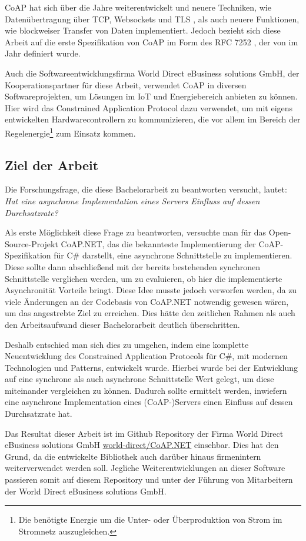 CoAP hat sich über die Jahre weiterentwickelt und neuere Techniken, wie Datenübertragung über TCP, Websockets und TLS \autocite{RFC8323}, als auch neuere Funktionen, wie blockweiser Transfer von Daten \autocite{RFC7959} implementiert. Jedoch bezieht sich diese Arbeit auf die erste Spezifikation von CoAP im Form des RFC 7252 \autocite{RFC7252}, der von \citeauthor{RFC7252} im Jahr \citeyear{RFC7252} definiert wurde.

Auch die Softwareentwicklungsfirma World Direct eBusiness solutions GmbH, der Kooperationspartner für diese Arbeit, verwendet CoAP in diversen Softwareprojekten, um Lösungen im IoT und Energiebereich anbieten zu können. Hier wird das Constrained Application Protocol dazu verwendet, um mit eigens entwickelten Hardwarecontrollern zu kommunizieren, die vor allem im Bereich der Regelenergie\footnote{Die benötigte Energie um die Unter- oder Überproduktion von Strom im Stromnetz auszugleichen.} zum Einsatz kommen.

\subsection{Ziel der Arbeit}
\label{subsec:ziel-der-arbeit}

Die Forschungsfrage, die diese Bachelorarbeit zu beantworten versucht, lautet: \textit{Hat eine asynchrone Implementation eines Servers Einfluss auf dessen Durchsatzrate?}

Als erste Möglichkeit diese Frage zu beantworten, versuchte man für das Open-Source-Projekt CoAP.NET, das die bekannteste Implementierung der CoAP-Spezifikation für C\# darstellt, eine asynchrone Schnittstelle zu implementieren. Diese sollte dann abschließend mit der bereits bestehenden synchronen Schnittstelle verglichen werden, um zu evaluieren, ob hier die implementierte Asynchronität Vorteile bringt. Diese Idee musste jedoch verworfen werden, da zu viele Änderungen an der Codebasis von CoAP.NET notwendig gewesen wären, um das angestrebte Ziel zu erreichen. Dies hätte den zeitlichen Rahmen als auch den Arbeitsaufwand dieser Bachelorarbeit deutlich überschritten.

Deshalb entschied man sich dies zu umgehen, indem eine komplette Neuentwicklung des Constrained Application Protocols für C\#, mit modernen Technologien und Patterns, entwickelt wurde. Hierbei wurde bei der Entwicklung auf eine synchrone als auch asynchrone Schnittstelle Wert gelegt, um diese miteinander vergleichen zu können. Dadurch sollte ermittelt werden, inwiefern eine asynchrone Implementation eines (CoAP-)Servers einen Einfluss auf dessen Durchsatzrate hat.

Das Resultat dieser Arbeit ist im Github Repository der Firma World Direct eBusiness solutions GmbH \href{https://github.com/world-direct/CoAP.NET}{world-direct/CoAP.NET} einsehbar. Dies hat den Grund, da die entwickelte Bibliothek auch darüber hinaus firmenintern weiterverwendet werden soll. Jegliche Weiterentwicklungen an dieser Software passieren somit auf diesem Repository und unter der Führung von Mitarbeitern der World Direct eBusiness solutions GmbH.